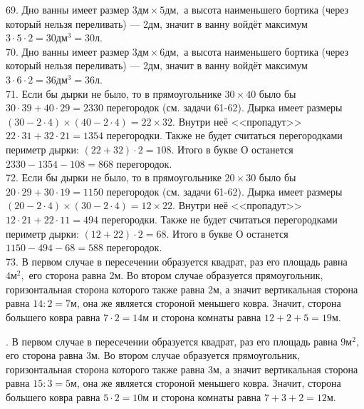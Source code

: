 \begin{center}
\begin{figure}[ht!]
\end{figure}
\end{center}
69. Дно ванны имеет размер $3\text{дм}\times5\text{дм},$ а высота наименьшего бортика (через который нельзя переливать) --- 2дм, значит в ванну войдёт максимум $3\cdot5\cdot2=30\text{дм}^3=30$л.\\
70. Дно ванны имеет размер $3\text{дм}\times6\text{дм},$ а высота наименьшего бортика (через который нельзя переливать) --- 2дм, значит в ванну войдёт максимум $3\cdot6\cdot2=36\text{дм}^3=36$л.\\
71. Если бы дырки не было, то в прямоугольнике $30\times40$ было бы $30\cdot39+40\cdot29=2330$ перегородок (см. задачи 61-62). Дырка имеет размеры $(30-2\cdot4)\times(40-2\cdot4)=22\times32.$ Внутри неё <<пропадут>> $22\cdot31+32\cdot21=1354$ перегородки. Также не будет считаться перегородками периметр дырки: $(22+32)\cdot2=108.$ Итого в букве О останется $2330-1354-108=868$ перегородок.\\
72. Если бы дырки не было, то в прямоугольнике $20\times30$ было бы $20\cdot29+30\cdot19=1150$ перегородок (см. задачи 61-62). Дырка имеет размеры $(20-2\cdot4)\times(30-2\cdot4)=12\times22.$ Внутри неё <<пропадут>> $12\cdot21+22\cdot11=494$ перегородки. Также не будет считаться перегородками периметр дырки: $(12+22)\cdot2=68.$ Итого в букве О останется $1150-494-68=588$ перегородок.\\
73. В первом случае в пересечении образуется квадрат, раз его площадь равна $4\text{м}^2,$ его сторона равна 2м. Во втором случае образуется прямоугольник, горизонтальная сторона которого также равна 2м, а значит вертикальная сторона равна $14:2=7$м, она же является стороной меньшего ковра. Значит, сторона большего ковра равна $7\cdot2=14$м и сторона комнаты равна $12+2+5=19$м.
\begin{center}
\begin{figure}[ht!]
\end{figure}
\end{center}
\newpage
{}. В первом случае в пересечении образуется квадрат, раз его площадь равна $9\text{м}^2,$ его сторона равна 3м. Во втором случае образуется прямоугольник, горизонтальная сторона которого также равна 3м, а значит вертикальная сторона равна $15:3=5$м, она же является стороной меньшего ковра. Значит, сторона большего ковра равна $5\cdot2=10$м и сторона комнаты равна $7+3+2=12$м.
